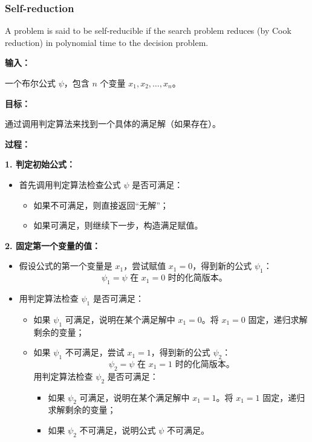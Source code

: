 \documentclass{article}
\begin{document}
\newpage

\subsubsection{Self-reduction}
A problem is said to be self-reducible if the search problem reduces (by Cook reduction) in polynomial time to the decision problem.\par
\textbf{输入：}\par  
一个布尔公式 $\psi$，包含 $n$ 个变量 $x_1, x_2, \dots, x_n$。\par

\textbf{目标：}  \par
通过调用判定算法来找到一个具体的满足解（如果存在）。\par

\textbf{过程：}  \par

\textbf{1. 判定初始公式：}\par
\begin{itemize}
    \item 首先调用判定算法检查公式 $\psi$ 是否可满足：
    \begin{itemize}
        \item 如果不可满足，则直接返回“无解”；
        \item 如果可满足，则继续下一步，构造满足赋值。
    \end{itemize}
\end{itemize}\par

\textbf{2. 固定第一个变量的值：}\par
\begin{itemize}
    \item 假设公式的第一个变量是 $x_1$，尝试赋值 $x_1 = 0$，得到新的公式 $\psi_1$：
    \[
    \psi_1 = \psi \text{ 在 } x_1 = 0 \text{ 时的化简版本}。
    \]
    \item 用判定算法检查 $\psi_1$ 是否可满足：
    \begin{itemize}
        \item 如果 $\psi_1$ 可满足，说明在某个满足解中 $x_1 = 0$。将 $x_1 = 0$ 固定，递归求解剩余的变量；
        \item 如果 $\psi_1$ 不可满足，尝试 $x_1 = 1$，得到新的公式 $\psi_2$：
        \[
        \psi_2 = \psi \text{ 在 } x_1 = 1 \text{ 时的化简版本}。
        \]
        用判定算法检查 $\psi_2$ 是否可满足：
        \begin{itemize}
            \item 如果 $\psi_2$ 可满足，说明在某个满足解中 $x_1 = 1$。将 $x_1 = 1$ 固定，递归求解剩余的变量；
            \item 如果 $\psi_2$ 不可满足，说明公式 $\psi$ 不可满足。
        \end{itemize}
    \end{itemize}
\end{itemize}\par
\end{document}
